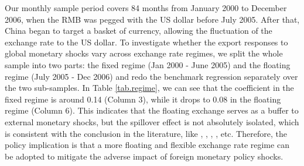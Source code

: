 Our monthly sample period covers 84 months from January 2000 to December 2006, when the RMB was pegged with the US dollar before July 2005. After that, China began to target a basket of currency, allowing the fluctuation of the exchange rate to the US dollar. To investigate whether the export responses to global monetary shocks vary across exchange rate regimes, we split the whole sample into two parts: the fixed regime (Jan 2000 - June 2005) and the floating regime (July 2005 - Dec 2006) and redo the benchmark regression separately over the two sub-samples. In Table \ref{tab.regime}, we can see that the coefficient in the fixed regime is around 0.14 (Column 3), while it drops to 0.08 in the floating regime (Column 6). This indicates that the floating exchange serves as a buffer to external monetary shocks, but the spillover effect is not absolutely isolated, which is consistent with the conclusion in the literature, like \cite{shambaugh2004effect}, \cite{klein2012exchange}, \cite{georgiadis2016determinants}, \cite{dedola2017if}, etc. Therefore, the policy implication is that a more floating and flexible exchange rate regime can be adopted to mitigate the adverse impact of foreign monetary policy shocks.

